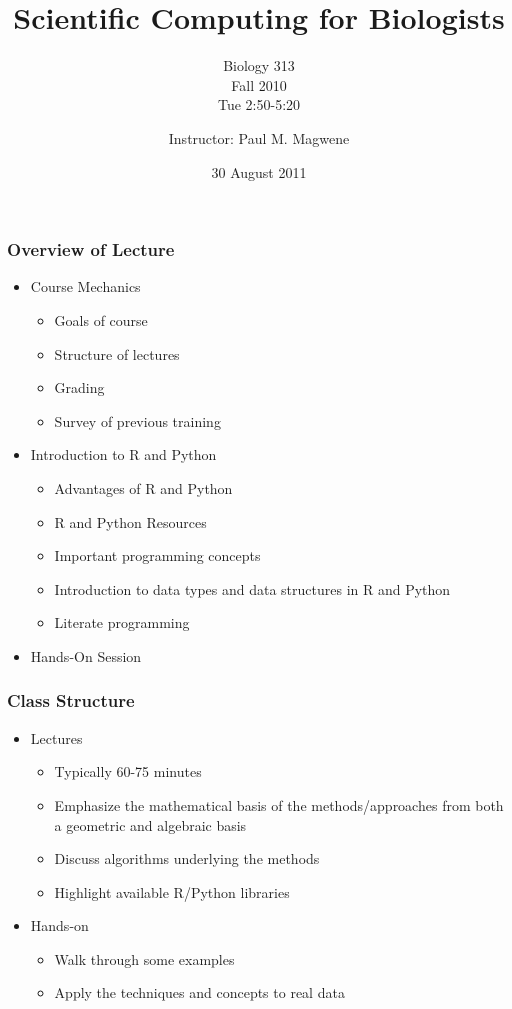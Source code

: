 \documentclass{beamer}
\title{Scientific Computing for Biologists}
\subtitle{Biology 313\\
Fall 2010\\
Tue 2:50-5:20
}
\author[P. Magwene]{Instructor: Paul M. Magwene}
\institute[Bio 313]{
Email: paul.magwene@duke.edu\\
Phone: 613-8159
}
\date{30 August 2011}
\begin{document}
\begin{frame}
\titlepage
\end{frame}

\begin{frame}
  \frametitle{Overview of Lecture}
  
\begin{itemize}
		\item Course Mechanics
		\begin{itemize}
			\item Goals of course
			\item Structure of lectures
			\item Grading
			\item Survey of previous training
		\end{itemize}
		\item Introduction to R and Python
		\begin{itemize}
			\item Advantages of R and Python
			\item R and Python Resources
			\item Important programming concepts
			\item Introduction to data types and data structures in R and Python
			\item Literate programming
		\end{itemize}
		\item Hands-On Session
\end{itemize}

\end{frame}


\begin{frame}
  \frametitle{Class Structure}
\begin{itemize}
	\item Lectures	
	
		\begin{itemize}
			\item Typically 60-75 minutes
			\item Emphasize the mathematical basis of the methods/approaches from both a geometric and algebraic basis
			\item Discuss algorithms underlying the methods
			\item Highlight available R/Python libraries
		\end{itemize}
		
	\item Hands-on
	
			\begin{itemize}
				\item Walk through some examples
				\item Apply the techniques and concepts to real data
			\end{itemize}
	
\end{itemize}

\end{frame}
\end{document}

